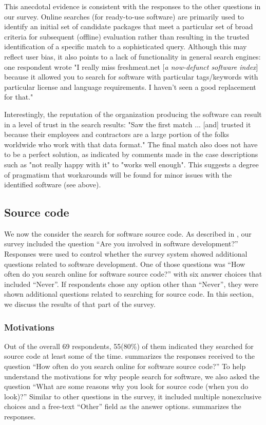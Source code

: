 \documentclass{casicswhitepaper}
\newcommand{\totalrespondents}{69\xspace}
\newcommand{\totalsearchers}{55\xspace}
\begin{document}
This anecdotal evidence is consistent with the responses to the other questions in our survey. Online searches (for ready-to-use software) are primarily used to identify an initial set of candidate packages that meet a particular set of broad criteria for subsequent (offline) evaluation rather than resulting in the trusted identification of a specific match to a sophisticated query. Although this may reflect user bias, it also points to a lack of functionality in general search engines: one respondent wrote "I really miss freshmeat.net [\emph{a now-defunct software index}] because it allowed you to search for software with particular tags/keywords with particular license and language requirements. I haven't seen a good replacement for that."

Interestingly, the reputation of the organization producing the software can result in a level of trust in the search results: "Saw the first match ... [and] trusted it because their employees and contractors are a large portion of the folks worldwide who work with that data format." The final match also does not have to be a perfect solution, as indicated by comments made in the case descriptions such as "not really happy with it" to "works well enough". This suggests a degree of pragmatism that workarounds will be found for minor issues with the identified software (see above).


\subsection{Source code}

We now the consider the search for software source code.  As described in , our survey included the question ``Are you involved in software development?'' Responses were used to control whether the survey system showed additional questions related to software development.  One of those questions was ``How often do you search online for software source code?'' with six answer choices that included ``Never''.  If respondents chose any option other than ``Never'', they were shown additional questions related to searching for source code.  In this section, we discuss the results of that part of the survey.


\subsubsection{Motivations}

Out of the overall \totalrespondents respondents, \totalsearchers (80\%) of them indicated they searched for source code at least some of the time.   summarizes the responses received to the question ``How often do you search online for software source code?''  To help understand the motivations for why people search for software, we also asked the question ``What are some reasons why you look for source code (when you do look)?''  Similar to other questions in the survey, it included multiple nonexclusive choices and a free-text ``Other'' field as the answer options.   summarizes the responses.
\end{document}
